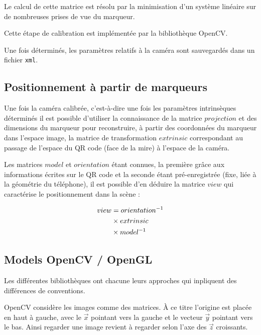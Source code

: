 \documentclass[10pt,a4paper,twoside, twocolumn]{report}
\begin{document}
Le calcul de cette matrice est résolu par la minimisation d’un système linéaire sur de nombreuses prises de vue du marqueur. 

Cette étape de calibration est implémentée par la bibliothèque OpenCV.

Une fois déterminés, les paramètres relatifs à la caméra sont sauvegardés dans un fichier \texttt{xml}.

\subsection{Positionnement à partir de marqueurs}\label{section:positionnement}

Une fois la caméra calibrée, c’est-à-dire une fois les paramètres intrinsèques déterminés il est possible d’utiliser la connaissance de la matrice $projection$ et des dimensions du marqueur pour reconstruire, à partir des coordonnées du marqueur dans l’espace image, la matrice de transformation $extrinsic$ correspondant au passage de l’espace du QR code (face de la mire) à l’espace de la caméra.

Les matrices $model$ et $orientation$ étant connues, la première grâce aux informations écrites sur le QR code et la seconde étant pré-enregistrée (fixe, liée à la géométrie du téléphone), il est possible d’en déduire la matrice $view$ qui caractérise le positionnement dans la scène :

\begin{align}
	view	&=			orientation^{-1}	\notag \\
				&\times extrinsic					\notag \\
				&\times model^{-1}
\end{align}

\subsection{Models OpenCV / OpenGL}

Les différentes bibliothèques ont chacune leurs approches qui inpliquent des différences de conventions.

OpenCV considère les images comme des matrices. À ce titre l’origine est placée en haut à gauche, avec le $\vec x$ pointant vers la gauche et le vecteur $\vec y$ pointant vers le bas. Ainsi regarder une image revient à regarder selon l’axe des $\vec z$ croissants.
\end{document}
